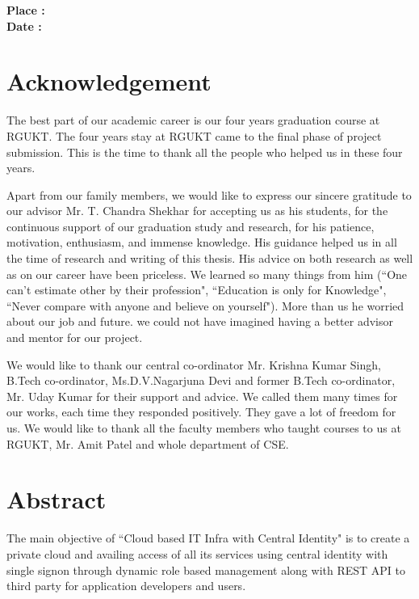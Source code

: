 \documentclass[12pt]{report}
\begin{document}
\hfill\break
\hfill\break
\hfill\break
\begin{flushleft}
\textbf{Place :} \underline{\hspace{5cm}} \\
\textbf{Date :} \underline{\hspace{5cm}}
\end{flushleft}

  
\chapter*{Acknowledgement}
\setcounter{page}{1}
\hspace{0.5cm}The best part of our academic career is our four years graduation course at RGUKT. The four years stay at RGUKT came to the final phase of project submission. This is the time to thank all the people who helped us in these four years.\newline

Apart from our family members, we would like to express our sincere gratitude to our advisor Mr. T. Chandra Shekhar for accepting us as his students, for the continuous support of our graduation study and research, for his patience, motivation, enthusiasm, and immense knowledge. His guidance helped us in all the time of research and writing of this thesis. His advice on both research as well as on our career have been priceless. We learned so many things from him (``One can't estimate other by their profession", ``Education is only for Knowledge", ``Never compare with anyone and believe on yourself"). More than us he worried about our job and future. we could not have imagined having a better advisor and mentor for our project. \newline

We would like to thank our central co-ordinator Mr. Krishna Kumar Singh, B.Tech co-ordinator, Ms.D.V.Nagarjuna Devi and former B.Tech co-ordinator, Mr. Uday Kumar for their support and advice. We called them many times for our works, each time they responded positively. They gave a lot of freedom for us. We would like to thank all the faculty members who taught courses to us at RGUKT, Mr. Amit Patel and whole department of CSE. \newline

\chapter*{Abstract}

\normalsize
\hspace{0.5cm}	The main objective of ``Cloud based IT Infra with Central Identity" is to create a private cloud and availing access of all its services using central identity with single signon through dynamic role based management along with REST API to third party for application developers and users. \newline
\end{document}
